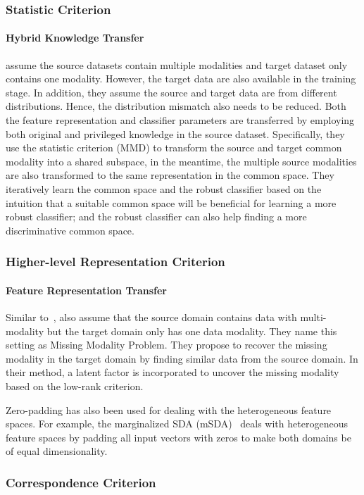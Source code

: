 \documentclass[prodmode]{acmsmall}  %
\begin{document}
\subsubsection{Statistic Criterion}
\paragraph{Hybrid Knowledge Transfer} 
 assume the source datasets contain multiple modalities and target dataset only contains one modality. However, the target data are also available in the training stage. In addition, they assume the source and target data are from different distributions. Hence, the distribution mismatch also needs to be reduced. Both the feature representation and classifier parameters are transferred by employing both original and privileged knowledge in the source dataset. Specifically, they use the statistic criterion (MMD) to transform the source and target common modality into a shared subspace, in the meantime, the multiple source modalities are also transformed to the same representation in the common space. They iteratively learn the common space and the robust classifier based on the intuition that a suitable common space will be beneficial for learning a more robust classifier; and the robust classifier can also help finding a more discriminative common space. 
\subsubsection{Higher-level Representation Criterion}
\paragraph{Feature Representation Transfer}
Similar to~\cite{Chen2014a},  also assume that the source domain contains data with multi-modality but the target domain only has one data modality. They name this setting as Missing Modality Problem. 
They propose to recover the missing modality in the target domain by finding similar data from the source domain. In their method, a latent factor is incorporated to uncover the missing modality based on the low-rank criterion.

Zero-padding has also been used for dealing with the heterogeneous feature spaces. For example, the marginalized SDA (mSDA)~\cite{Chen2012} deals with heterogeneous feature spaces by padding all input vectors with zeros to make both domains be of equal dimensionality.
\subsubsection{Correspondence Criterion}
\end{document}

